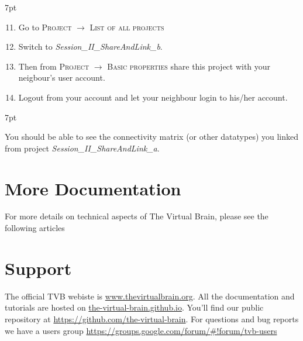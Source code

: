 \documentclass{tufte-handout}
\newenvironment{formal}{%
  \def\FrameCommand{%
    \hspace{1pt}%
    {\color{DarkBlue}\vrule width 2pt}%
    {\color{formalshade}\vrule width 4pt}%
    \colorbox{formalshade}%
  }%
  \MakeFramed{\advance\hsize-\width\FrameRestore}%
  \noindent\hspace{-4.55pt}%
  \begin{adjustwidth}{}{7pt}%
  \vspace{2pt}\vspace{2pt}%
}
{%
  \vspace{2pt}\end{adjustwidth}\endMakeFramed%
}
\newenvironment{blah}{%
  \def\FrameCommand{%
    \hspace{1pt}%
    {\color{DarkOrange}\vrule width 2pt}%
    {\color{PeachPuff}\vrule width 4pt}%
    \colorbox{PeachPuff}%
  }%
  \MakeFramed{\advance\hsize-\width\FrameRestore}%
  \noindent\hspace{-4.55pt}%
  \begin{adjustwidth}{}{7pt}%
  \vspace{2pt}\vspace{2pt}%
}
{%
  \vspace{2pt}\end{adjustwidth}\endMakeFramed%
}
\begin{document}
\begin{formal}
  \begin{enumerate}[resume]
    \setcounter{enumi}{10}
    \item Go to \textsc{Project} $\rightarrow$ \textsc{List of all projects}
    \item Switch to \textit{Session\_II\_ShareAndLink\_b}.
    \item Then from \textsc{Project} $\rightarrow$ \textsc{Basic properties} 
share this project with your neigbour's user account. 
    \item Logout from your account and let your neighbour login to his/her account. 
  \end{enumerate}
\end{formal} 

\begin{blah}
You should be able to see the connectivity matrix (or other datatypes) you linked
from project \textit{Session\_II\_ShareAndLink\_a}.
\end{blah}

\section{More Documentation}\label{sec:more-doc}

For more details on technical aspects of The Virtual Brain, please see the following articles
\citep{Sanz-Leon_2013, Woodman_2014}

\section{Support}\label{sec:support}

The official TVB webiste is \url{www.thevirtualbrain.org}.  
All the documentation and tutorials are hosted on \url{the-virtual-brain.github.io}.
You'll find our public  repository at \url{https://github.com/the-virtual-brain}. 
For questions and bug reports we have a users group \url{https://groups.google.com/forum/#!forum/tvb-users}



\end{document}
